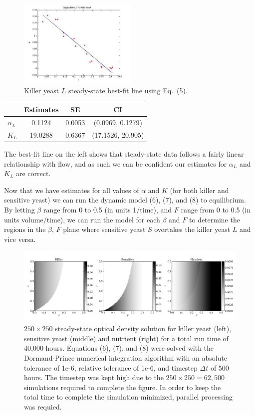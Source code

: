 \begin{multicols}{2}
\begin{figure}[H]
  \centering
    \includegraphics[width=0.5\textwidth]{images/killerFit.jpg}
  \caption{\footnotesize Killer yeast $L$ steady-state best-fit line using Eq.\ (5).}
\end{figure}
\begin{center}
\begin{tabular}{l | c c c}
  & Estimates & SE & CI \\ 
  \hline
  $\alpha_L$ & 0.1124  & 0.0053 & (0.0969,  0.1279) \\
  $K_L$      & 19.0288 & 0.6367 & (17.1526, 20.905) \\
\end{tabular}
\end{center}
The best-fit line on the left shows that steady-state data follows a fairly linear relationship with flow, and as such we can be confident our estimates for $\alpha_L$ and $K_L$ are correct.
\end{multicols}

Now that we have estimates for all values of $\alpha$ and $K$ (for both killer and sensitive yeast) we can run the dynamic model (6), (7), and (8) to equilibrium.  By letting $\beta$ range from 0 to 0.5 (in units 1/time), and $F$ range from 0 to 0.5 (in units volume/time), we can run the model for each $\beta$ and $F$ to determine the regions in the $\beta$, $F$ plane where sensitive yeast $S$ overtakes the killer yeast $L$ and vice versa.
\begin{figure}[H]
  \centering
    \includegraphics[width=1.0\textwidth]{images/sols.png}
  \caption{\footnotesize $250 \times 250$ steady-state optical density solution for killer yeast (left), sensitive yeast (middle) and nutrient (right) for a total run time of 40,000 hours.  Equations (6), (7), and (8) were solved with the Dormand-Prince numerical integration algorithm with an absolute tolerance of 1e-6, relative tolerance of 1e-6, and timestep $\Delta t$ of 500 hours.  The timestep was kept high due to the $250 \times 250 = 62,500$ simulations required to complete the figure.  In order to keep the total time to complete the simulation minimized, parallel processing was requied.}
\end{figure}

